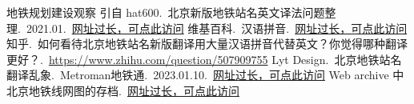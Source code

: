 \documentclass[a4paper,UTF8,12pt]{ctexart}
\begin{document}
\begin{thebibliography}{100}
地铁规划建设观察 引自 hat600.\ 北京新版地铁站名英文译法问题整理.\ 2021.01.\ \href{https://mp.weixin.qq.com/s/0HDydNVBMMhmU4F_vtYloQ}{网址过长，可点此访问}
维基百科.\ 汉语拼音.\ \href{https://zh.wikipedia.org/wiki/%E6%B1%89%E8%AF%AD%E6%8B%BC%E9%9F%B3}{网址过长，可点此访问}
知乎.\ 如何看待北京地铁站名新版翻译用大量汉语拼音代替英文？你觉得哪种翻译更好？.\ \href{https://www.zhihu.com/question/507909755}{https://www.zhihu.com/question/507909755}
Lyt Design.\ 北京地铁站名翻译乱象.\ Metroman地铁通.\ 2023.01.10.\ \href{https://mp.weixin.qq.com/s/CJPA2Dn2_GV0ARfjM_Ue1Q}{网址过长，可点此访问}
Web archive 中北京地铁线网图的存档.\ \href{https://web.archive.org/web/20230000000000*/https://bjsubway.com/jpg.html}{网址过长，可点此访问}
\end{thebibliography}
\end{document}
